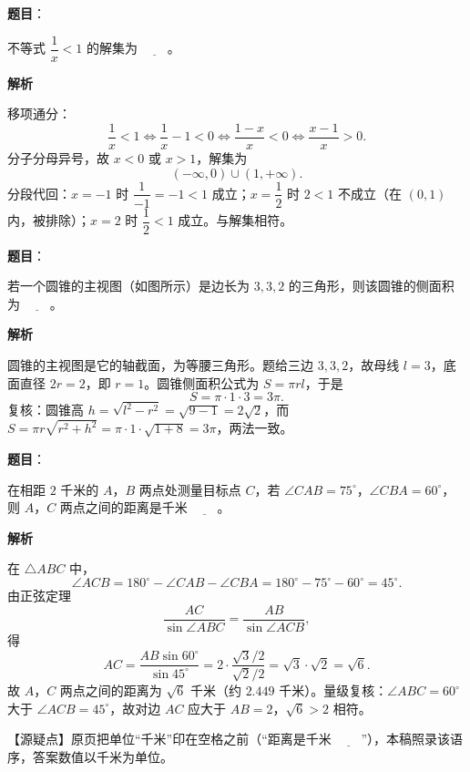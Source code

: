 \begin{answer}

\textbf{题目}：

不等式 $\dfrac1x<1$ 的解集为 $\underline{\qquad}$。

\textbf{解析}

移项通分：
\nopagebreak[4]
\[\frac1x<1\iff\frac1x-1<0\iff\frac{1-x}{x}<0\iff\frac{x-1}{x}>0.\]
分子分母异号，故 $x<0$ 或 $x>1$，解集为
\nopagebreak[4]
\[(-\infty,0)\cup(1,+\infty).\]
分段代回：$x=-1$ 时 $\dfrac1{-1}=-1<1$ 成立；$x=\dfrac12$ 时 $2<1$ 不成立（在 $(0,1)$ 内，被排除）；$x=2$ 时 $\dfrac12<1$ 成立。与解集相符。


\end{answer}
\begin{answer}

\textbf{题目}：

若一个圆锥的主视图（如图所示）是边长为 $3,3,2$ 的三角形，则该圆锥的侧面积为 $\underline{\qquad}$。
\nopagebreak[4]
\begin{center}\end{center}
\nopagebreak[4]
\textbf{解析}

圆锥的主视图是它的轴截面，为等腰三角形。题给三边 $3,3,2$，故母线 $l=3$，底面直径 $2r=2$，即 $r=1$。圆锥侧面积公式为 $S=\pi rl$，于是
\nopagebreak[4]
\[S=\pi\cdot1\cdot3=3\pi.\]
复核：圆锥高 $h=\sqrt{l^2-r^2}=\sqrt{9-1}=2\sqrt2$，而 $S=\pi r\sqrt{r^2+h^2}=\pi\cdot1\cdot\sqrt{1+8}=3\pi$，两法一致。


\end{answer}
\begin{answer}

\textbf{题目}：

在相距 $2$ 千米的 $A$，$B$ 两点处测量目标点 $C$，若 $\angle CAB=75^\circ$，$\angle CBA=60^\circ$，则 $A$，$C$ 两点之间的距离是千米 $\underline{\qquad}$。

\textbf{解析}

在 $\triangle ABC$ 中，
\nopagebreak[4]
\[\angle ACB=180^\circ-\angle CAB-\angle CBA=180^\circ-75^\circ-60^\circ=45^\circ.\]
由正弦定理
\nopagebreak[4]
\[\frac{AC}{\sin\angle ABC}=\frac{AB}{\sin\angle ACB},\]
得
\nopagebreak[4]
\[AC=\frac{AB\sin60^\circ}{\sin45^\circ}=2\cdot\frac{\sqrt3/2}{\sqrt2/2}=\sqrt3\cdot\sqrt2=\sqrt6.\]
故 $A$，$C$ 两点之间的距离为 $\sqrt6$ 千米（约 $2.449$ 千米）。量级复核：$\angle ABC=60^\circ$ 大于 $\angle ACB=45^\circ$，故对边 $AC$ 应大于 $AB=2$，$\sqrt6>2$ 相符。

【源疑点】原页把单位“千米”印在空格之前（“距离是千米 $\underline{\qquad}$”），本稿照录该语序，答案数值以千米为单位。


\end{answer}
